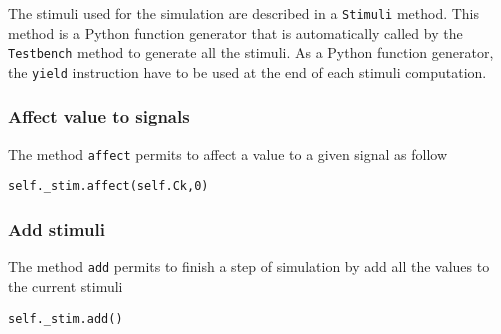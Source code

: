 The stimuli used for the simulation are described in a \verb-Stimuli- method. This method is a Python function generator that is automatically called by the \verb-Testbench- method to generate all the stimuli. As a Python function generator, the \verb-yield- instruction have to be used at the end of each stimuli computation.

\subsubsection{Affect value to signals}
The method \verb-affect- permits to affect a value to a given signal as follow
\begin{verbatim}
self._stim.affect(self.Ck,0)
\end{verbatim}

\subsubsection{Add stimuli}
The method \verb-add- permits to finish a step of simulation by add all the values to the current stimuli
\begin{verbatim}
self._stim.add()
\end{verbatim}
